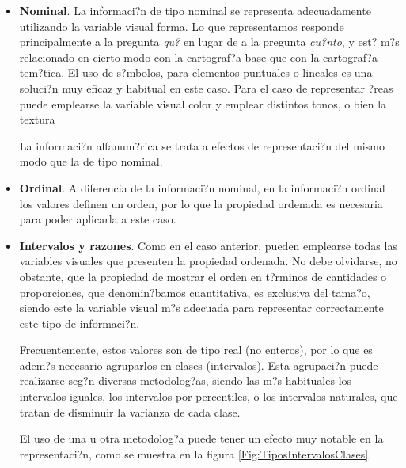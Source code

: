 \begin{itemize}
	\item \textbf{Nominal}. La informaci?n de tipo nominal se representa adecuadamente utilizando la variable visual forma. Lo que representamos responde principalmente a la pregunta \emph{qu?} en lugar de a la pregunta \emph{cu?nto}, y est? m?s relacionado en cierto modo con la cartograf?a base que con la cartograf?a tem?tica. El uso de s?mbolos, para elementos puntuales o lineales es una soluci?n muy eficaz y habitual en este caso. Para el caso de representar ?reas puede emplearse la variable visual color y emplear distintos tonos, o bien la textura
	
	La informaci?n alfanum?rica se trata a efectos de representaci?n del mismo modo que la de tipo nominal.
	

	\item \textbf{Ordinal}. A diferencia de la informaci?n nominal, en la informaci?n ordinal los valores definen un orden, por lo que la propiedad ordenada es necesaria para poder aplicarla a este caso.
	
	\item \textbf{Intervalos y razones}. Como en el caso anterior, pueden emplearse todas las variables visuales que presenten la propiedad ordenada. No debe olvidarse, no obstante, que la propiedad de mostrar el orden en t?rminos de cantidades o proporciones, que denomin?bamos cuantitativa, es exclusiva del tama?o, siendo este la variable visual m?s adecuada para representar correctamente este tipo de informaci?n.

	Frecuentemente, estos valores son de tipo real (no enteros), por lo que es adem?s necesario agruparlos en clases (intervalos). Esta agrupaci?n puede realizarse seg?n diversas metodolog?as, siendo las m?s habituales los intervalos iguales, los intervalos por percentiles, o los intervalos naturales, que tratan de disminuir la varianza de cada clase.

	El uso de una u otra metodolog?a puede tener un efecto muy notable en la representaci?n, como se muestra en la figura \ref{Fig:TiposIntervalosClases}.


\end{itemize}

